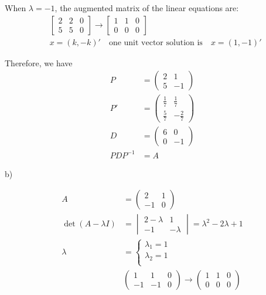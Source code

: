 \documentclass[letterpaper, 11pt]{article}
\newcommand{\1}{\mathds{1}}	%
\theoremstyle{definition}
\begin{document}
When $\lambda=-1$, the augmented matrix of the linear equations are:
\begin{align*}
    &\left[\begin{array}{cc|c}
        2 & 2 & 0 \\
        5 & 5 & 0 
    \end{array}\right] \to \left[\begin{array}{cc|c}
        1 & 1 & 0 \\
        0 & 0 & 0 
    \end{array}\right] \\
    &x = (k , -k)'\quad \text{one unit vector solution is} \quad x = (1,-1)'
\end{align*}

Therefore, we have \begin{align*}
    P &= \begin{pmatrix}
        2 & 1 \\
        5 & -1
    \end{pmatrix} \\
    P' &= \begin{pmatrix}
        \frac{1}{7} & \frac{1}{7}\\
        \frac{5}{7} & -\frac{2}{7}
    \end{pmatrix} \\
    D &= \begin{pmatrix}
        6 & 0 \\
        0 & -1
    \end{pmatrix} \\
    PDP ^{-1} &=  A
\end{align*}


b)

\begin{align*}
    A &= \begin{pmatrix}
        2 & 1 \\
        -1 & 0
    \end{pmatrix} \\
    \det (A-\lambda I) &= \begin{vmatrix}
        2-\lambda & 1 \\
        -1 & -\lambda
    \end{vmatrix}= \lambda ^{2}-2\lambda+1\\
    \lambda &= \left\{\begin{array}{l}
        \lambda_{1} = 1\\
        \lambda_{2} = 1\\
    \end{array}\right. \\
     &\left(\begin{array}{cc|c}
        1 & 1 & 0 \\
        -1 & -1 & 0 
     \end{array}\right) \to \left(\begin{array}{cc|c}
        1 & 1 & 0 \\
        0 & 0 & 0 
     \end{array}\right)
\end{align*}
\end{document}
